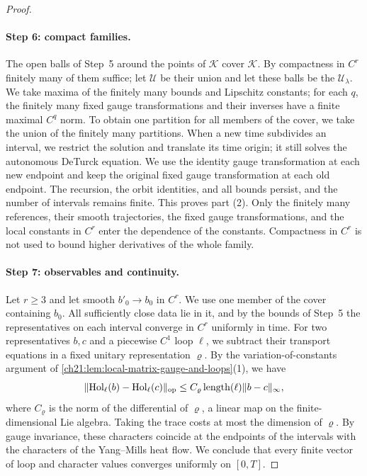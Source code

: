 \begin{proof}
\paragraph{Step 6: compact families.}
The open balls of Step~5 around the points of $\mathscr K$ cover $\mathscr K$. By compactness in $C^r$ finitely many of them suffice; let $\mathscr U$ be their union and let these balls be the $\mathscr U_\lambda$. We take maxima of the finitely many bounds and Lipschitz constants; for each $q$, the finitely many fixed gauge transformations and their inverses have a finite maximal $C^q$ norm. To obtain one partition for all members of the cover, we take the union of the finitely many partitions. When a new time subdivides an interval, we restrict the solution and translate its time origin; it still solves the autonomous DeTurck equation. We use the identity gauge transformation at each new endpoint and keep the original fixed gauge transformation at each old endpoint. The recursion, the orbit identities, and all bounds persist, and the number of intervals remains finite. This proves part (2). Only the finitely many references, their smooth trajectories, the fixed gauge transformations, and the local constants in $C^r$ enter the dependence of the constants. Compactness in $C^r$ is not used to bound higher derivatives of the whole family.

\paragraph{Step 7: observables and continuity.}
Let $r\ge3$ and let smooth $b'_0\to b_0$ in $C^r$. We use one member of the cover containing $b_0$. All sufficiently close data lie in it, and by the bounds of Step~5 the representatives on each interval converge in $C^r$ uniformly in time. For two representatives $b,c$ and a piecewise $C^1$ loop $\ell$, we subtract their transport equations in a fixed unitary representation $\varrho$. By the variation-of-constants argument of \cref{ch21:lem:local-matrix-gauge-and-loops}(1), we have
\[
 \lVert \operatorname{Hol}_\ell(b)-\operatorname{Hol}_\ell(c)\rVert_{\mathrm{op}}\le C_\varrho\operatorname{length}(\ell)\lVert b-c\rVert_\infty,
\]
where $C_\varrho$ is the norm of the differential of $\varrho$, a linear map on the finite-dimensional Lie algebra. Taking the trace costs at most the dimension of $\varrho$. By gauge invariance, these characters coincide at the endpoints of the intervals with the characters of the Yang--Mills heat flow. We conclude that every finite vector of loop and character values converges uniformly on $[0,T]$.


\end{proof}

